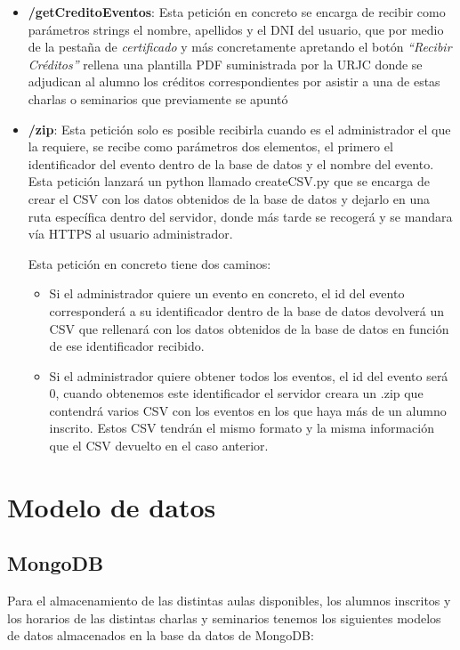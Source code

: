 \documentclass[a4paper, 12pt]{book}
\begin{document}
\begin{itemize}
	\item \textbf{/getCreditoEventos}: Esta petición en concreto se encarga de recibir como parámetros strings el nombre, apellidos y el DNI del usuario, que por medio de la pestaña de \textit{certificado} y más concretamente apretando el botón \textit{``Recibir Créditos''} rellena una plantilla PDF suministrada por la URJC donde se adjudican al alumno los créditos correspondientes por asistir a una de estas charlas o seminarios que previamente se apuntó
	

	\item \textbf{/zip}: Esta petición solo es posible recibirla cuando es el administrador el que la requiere, se recibe como parámetros dos elementos, el primero el identificador del evento dentro de la base de datos y el nombre del evento. Esta petición lanzará un python llamado createCSV.py que se encarga de crear el CSV con los datos obtenidos de la base de datos y dejarlo en una ruta específica dentro del servidor, donde más tarde se recogerá y se mandara vía HTTPS al usuario administrador.

Esta petición en concreto tiene dos caminos:
\begin{itemize}
	\item  Si el administrador quiere un evento en concreto, el id del evento corresponderá a su identificador dentro de la base de datos devolverá un CSV que rellenará con los datos obtenidos de la base de datos en función de ese identificador recibido. 
	\item Si el administrador quiere obtener todos los eventos, el id del evento será 0, cuando obtenemos este identificador el servidor creara un .zip que contendrá varios CSV con los eventos en los que haya más de un alumno inscrito. Estos CSV tendrán el mismo formato y la misma información que el CSV devuelto en el caso anterior.
\end{itemize}
\end{itemize}


\section{Modelo de datos} 
\label{sec:modelo de datos}

\subsection{MongoDB}
	Para el almacenamiento de las distintas aulas disponibles, los alumnos inscritos y los horarios de las distintas charlas y seminarios tenemos los siguientes modelos de datos almacenados en la base da datos de MongoDB:
	
\end{document}
